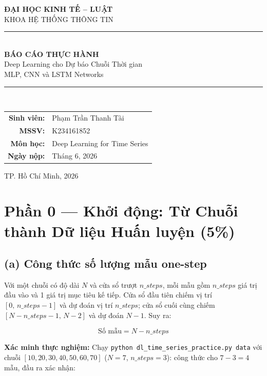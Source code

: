 \documentclass[12pt,a4paper]{article}
\begin{document}
\begin{titlepage}
    \centering
    \vspace*{2cm}
    {\Large\textbf{ĐẠI HỌC KINH TẾ -- LUẬT}}\\[0.3em]
    {\large KHOA HỆ THỐNG THÔNG TIN}\\[2cm]
    \rule{\linewidth}{0.5mm}\\[0.4cm]
    {\LARGE\textbf{BÁO CÁO THỰC HÀNH}}\\[0.3em]
    {\Large Deep Learning cho Dự báo Chuỗi Thời gian}\\[0.2em]
    {\large MLP, CNN và LSTM Networks}\\
    \rule{\linewidth}{0.5mm}\\[2cm]
    \begin{tabular}{rl}
        \textbf{Sinh viên:} & Phạm Trần Thanh Tài \\[0.3em]
        \textbf{MSSV:}      & K234161852 \\[0.3em]
        \textbf{Môn học:}   & Deep Learning for Time Series \\[0.3em]
        \textbf{Ngày nộp:}  & Tháng 6, 2026 \\
    \end{tabular}
    \vfill
    {\large TP. Hồ Chí Minh, 2026}
\end{titlepage}

\tableofcontents
\newpage

\section{Phần 0 --- Khởi động: Từ Chuỗi thành Dữ liệu Huấn luyện (5\%)}

\subsection{(a) Công thức số lượng mẫu one-step}

Với một chuỗi có độ dài $N$ và cửa sổ trượt $n\_steps$, mỗi mẫu gồm $n\_steps$ giá trị đầu vào và 1 giá trị mục tiêu kế tiếp. Cửa sổ đầu tiên chiếm vị trí $[0,\, n\_steps-1]$ và dự đoán vị trí $n\_steps$; cửa sổ cuối cùng chiếm $[N-n\_steps-1,\, N-2]$ và dự đoán $N-1$. Suy ra:

\[
\boxed{\text{Số mẫu} = N - n\_steps}
\]

\textbf{Xác minh thực nghiệm:} Chạy \texttt{python dl\_time\_series\_practice.py data} với chuỗi $[10, 20, 30, 40, 50, 60, 70]$ ($N=7$, $n\_steps=3$): công thức cho $7-3=4$ mẫu, đầu ra xác nhận:
\end{document}
